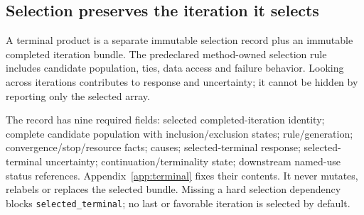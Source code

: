 {{\subsection*{Selection preserves the iteration it selects}
A terminal product is a separate immutable selection record plus an immutable
completed iteration bundle. The predeclared method-owned selection rule
includes candidate population, ties, data access and failure behavior. Looking
across iterations contributes to response and uncertainty; it cannot be
hidden by reporting only the selected array.

The record has nine required fields: selected completed-iteration identity;
complete candidate population with inclusion/exclusion states; rule/generation;
convergence/stop/resource facts; causes; selected-terminal response;
selected-terminal uncertainty; continuation/terminality state; downstream
named-use status references. Appendix~\ref{app:terminal} fixes their contents.
It never mutates, relabels or replaces the selected bundle. Missing a hard
selection dependency blocks \texttt{selected\_terminal}; no last or favorable
iteration is selected by default.
}}
